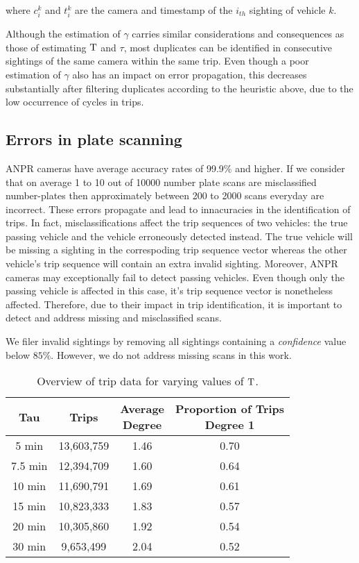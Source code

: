 where $c_i^k$ and $t_i^k$ are the camera and timestamp of the $i_{th}$ sighting of vehicle $k$.

 Although the estimation of $\gamma$ carries similar considerations and consequences as those of estimating $\mathrm{T}$ and $\tau$, most duplicates can be identified in consecutive sightings of the same camera within the same trip. Even though a poor estimation of $\gamma$ also has an impact on error propagation, this decreases substantially after filtering duplicates according to the heuristic above, due to the low occurrence of cycles in trips.
\vspace{-0.25cm}

\subsection{Errors in plate scanning}

ANPR cameras have average accuracy rates of 99.9\% and higher. If we consider that on average 1 to 10 out of 10000 number plate scans are misclassified number-plates then approximately between 200 to 2000 scans everyday are incorrect. These errors propagate and lead to innacuracies in the identification of trips. In fact, misclassifications affect the trip sequences of two vehicles: the true passing vehicle and the vehicle erroneously detected instead. The true vehicle will be missing a sighting in the correspoding trip sequence vector whereas the other vehicle's trip sequence will contain an extra invalid sighting. Moreover, ANPR cameras may exceptionally fail to detect passing vehicles. Even though only the passing vehicle is affected in this case, it's trip sequence vector is nonetheless affected. Therefore, due to their impact in trip identification, it is important to detect and address missing and misclassified scans.

We filer invalid sightings by removing all sightings containing a \emph{confidence} value below $85\%$. However, we do not address missing scans in this work.

\begin{table}[!ht]
\centering
\tabcolsep=0.25cm
\begin{tabular}{c c c c}
  \hline
Tau & Trips & \thead{Average\\Degree} & \thead{Proportion of Trips \\ Degree 1} \\
  \hline
5 min & 13,603,759 & 1.46 & 0.70 \\
7.5 min & 12,394,709 & 1.60 & 0.64 \\
10 min & 11,690,791 & 1.69 & 0.61 \\
15 min & 10,823,333 & 1.83 & 0.57 \\
20 min & 10,305,860 & 1.92 & 0.54 \\
30 min &  9,653,499 & 2.04 & 0.52 \\
   \hline
\end{tabular}
\caption{Overview of trip data for varying values of $\mathrm{T}$.}
\label{t:trips-tau}
\vspace{-0.5cm}
\end{table}
